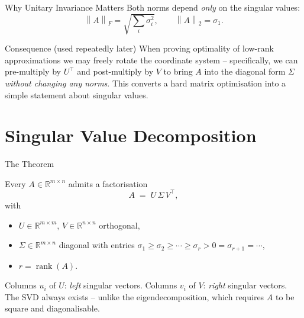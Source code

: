 \documentclass[10pt,aspectratio=169]{beamer}
\DeclareMathOperator{\rank}{rank}
\newcommand{\R}{\mathbb{R}}
\newcommand{\norm}[1]{\left\|#1\right\|}
\begin{document}
\begin{frame}{Why Unitary Invariance Matters}
  Both norms depend \emph{only} on the singular values:
  \[
    \norm{A}_F = \sqrt{\textstyle\sum_i \sigma_i^2}, \qquad \norm{A}_2 = \sigma_1.
  \]

  \begin{block}{Consequence (used repeatedly later)}
    When proving optimality of low-rank approximations we may freely rotate the coordinate system -- specifically, we can pre-multiply by $U^\top$ and post-multiply by $V$ to bring $A$ into the diagonal form $\Sigma$ \emph{without changing any norms}. This converts a hard matrix optimisation into a simple statement about singular values.
  \end{block}
\end{frame}

\section{Singular Value Decomposition}

\begin{frame}{The Theorem}
  \begin{theorem}[SVD]
    Every $A \in \R^{m \times n}$ admits a factorisation
    \[
      A \;=\; U\,\Sigma\,V^\top,
    \]
    with
    \begin{itemize}
      \item $U \in \R^{m\times m}$, $V \in \R^{n\times n}$ orthogonal,
      \item $\Sigma \in \R^{m\times n}$ diagonal with entries
        $\sigma_1 \geq \sigma_2 \geq \cdots \geq \sigma_r > 0 = \sigma_{r+1} = \cdots,$
      \item $r = \rank(A)$.
    \end{itemize}
  \end{theorem}
  Columns $u_i$ of $U$: \emph{left} singular vectors. Columns $v_i$ of $V$: \emph{right} singular vectors.\\
  \medskip
  The SVD always exists -- unlike the eigendecomposition, which requires $A$ to be square and diagonalisable.
\end{frame}
\end{document}
